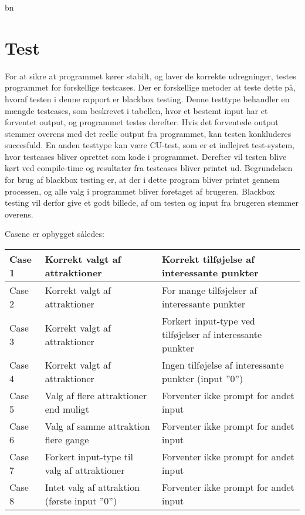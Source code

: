 bn\chapter{Test}
For at sikre at programmet kører stabilt, og laver de korrekte udregninger, testes programmet for forskellige testcases. Der er forskellige metoder at teste dette på, hvoraf testen i denne rapport er blackbox testing. Denne testtype behandler en mængde testcases, som beskrevet i tabellen, hvor et bestemt input har et forventet output, og programmet testes derefter. Hvis det forventede output stemmer overens med det reelle output fra programmet, kan testen konkluderes succesfuld. 
En anden testtype kan være CU-test, som er et indlejret test-system, hvor testcases bliver oprettet som kode i programmet. Derefter vil testen blive kørt ved compile-time og resultater fra testcases bliver printet ud. Begrundelsen for brug af blackbox testing er, at der i dette program bliver printet gennem processen, og alle valg i programmet bliver foretaget af brugeren. Blackbox testing vil derfor give et godt billede, af om testen og input fra brugeren stemmer overens.

Casene er opbygget således:\newline
\begin{tabular}{|l|l| p{5cm}|}
	\hline
	Case 1 & Korrekt valgt af attraktioner & Korrekt tilføjelse af interessante punkter \\ \hline
	Case 2 & Korrekt valgt af attraktioner & For mange tilføjelser af interessante punkter \\ \hline
	Case 3 & Korrekt valgt af attraktioner & Forkert input-type ved tilføjelser af interessante punkter\\ \hline
	Case 4 & Korrekt valgt af attraktioner & Ingen tilføjelse af interessante punkter (input ”0”) \\ \hline
	Case 5 & Valg af flere attraktioner end muligt & Forventer ikke prompt for andet input\\ \hline
	Case 6 & Valg af samme attraktion flere gange &	Forventer ikke prompt for andet input\\ \hline
	Case 7 & Forkert input-type til valg af attraktioner & Forventer ikke prompt for andet input\\ \hline
	Case 8 & Intet valg af attraktion (første input ”0”) & Forventer ikke prompt for andet input\\ \hline
\end{tabular} 
\newline

